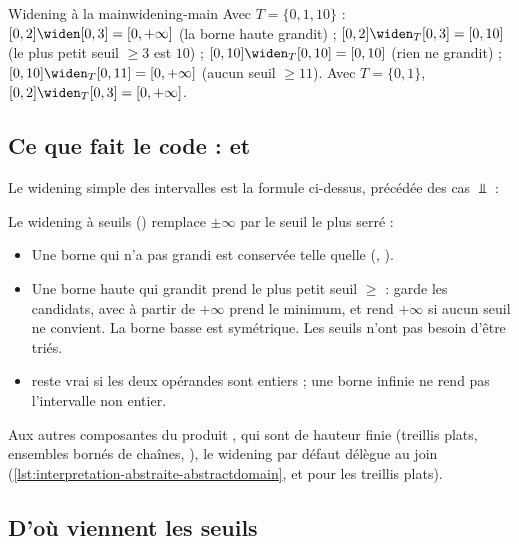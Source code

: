 \begin{exemple}{Widening à la main}{widening-main}
  Avec $T = \{0, 1, 10\}$ :
  $[0,2] \widen [0,3] = [0, +\infty]$ (la borne haute grandit) ;
  $[0,2] \widen_T [0,3] = [0, 10]$ (le plus petit seuil $\ge 3$ est $10$) ;
  $[0,10] \widen_T [0,10] = [0,10]$ (rien ne grandit) ;
  $[0,10] \widen_T [0,11] = [0, +\infty]$ (aucun seuil $\ge 11$).
  Avec $T = \{0, 1\}$, $[0,2] \widen_T [0,3] = [0,+\infty]$.
\end{exemple}

\subsection{Ce que fait le code :  et }

Le widening simple des intervalles est la formule ci-dessus, précédée des cas
$\Bot$ :


Le widening à seuils () remplace $\pm\infty$ par le seuil le plus
serré :


\begin{itemize}
  \item Une borne qui n'a pas grandi est conservée telle quelle
    (, ).
  \item Une borne haute qui grandit prend le plus petit seuil
    $\ge$  :  garde les candidats, 
    avec  à partir de $+\infty$ prend le minimum, et rend
    $+\infty$ si aucun seuil ne convient. La borne basse est symétrique. Les
    seuils n'ont pas besoin d'être triés.
  \item {} reste vrai si les deux opérandes sont entiers ; une borne
    infinie ne rend pas l'intervalle non entier.
\end{itemize}

Aux autres composantes du produit , qui sont de hauteur
finie (treillis plats, ensembles bornés de chaînes, ), le
widening par défaut délègue au join
(\cref{lst:interpretation-abstraite-abstractdomain}, et
 pour les treillis plats).

\subsection{D'où viennent les seuils}

